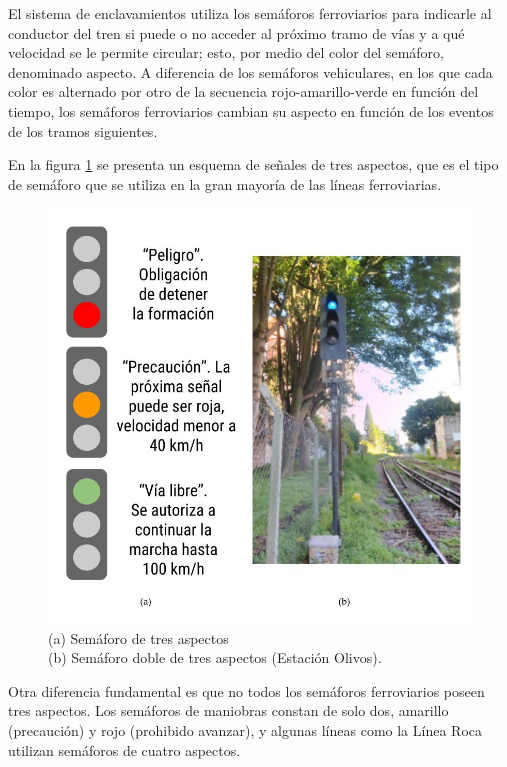 			El sistema de enclavamientos utiliza los semáforos ferroviarios para indicarle al conductor del tren si puede o no acceder al próximo tramo de vías y a qué velocidad se le permite circular; esto, por medio del color del semáforo, denominado aspecto. A diferencia de los semáforos vehiculares, en los que cada color es alternado por otro de la secuencia rojo-amarillo-verde en función del tiempo, los semáforos ferroviarios cambian su aspecto en función de los eventos de los tramos siguientes.
					
			En la figura \ref{fig:Sem_3Aspectos} se presenta un esquema de señales de tres aspectos, que es el tipo de semáforo que se utiliza en la gran mayoría de las líneas ferroviarias.
						 	
			 \begin{figure}[htbp!]
				\centering
				\includegraphics[scale=.35]{./Figures/Sem3}
				\caption{(a) Semáforo de tres aspectos\\(b) Semáforo doble de tres aspectos (Estación Olivos).}
				\label{fig:Sem_3Aspectos}
			\end{figure}
			
			Otra diferencia fundamental es que no todos los semáforos ferroviarios poseen tres aspectos. Los semáforos de maniobras constan de solo dos, amarillo (precaución) y rojo (prohibido avanzar), y algunas líneas como la Línea Roca utilizan semáforos de cuatro aspectos.	
			
